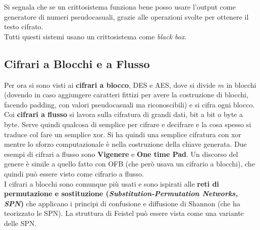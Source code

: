 \documentclass[a4paper,12pt, oneside]{book}
\begin{document}
Si segnala che se un crittosistema funziona bene posso usare l'output come
generatore di numeri pseudocasuali, grazie alle operazioni svolte per ottenere
il testo cifrato.\\
Tutti questi sistemi usano un crittosistema come \textit{black box}.\\
\subsection{Cifrari a Blocchi e a Flusso}
Per ora si sono visti ai \textbf{cifrari a blocco}, DES e AES, dove si divide
$m$ in blocchi (dovendo in caso aggiungere caratteri fittizi per avere la
costruzione di blocchi, facendo padding,
con valori pseudocasuali ma riconoscibili) e si cifra ogni blocco.\\
Coi \textbf{cifrari a flusso} si lavora sulla cifratura di grandi dati, bit a
bit o byte a byte. Serve quindi qualcosa di semplice per cifrare e decifrare e
la cosa spesso si traduce col fare un semplice xor. Si ha quindi una semplice
cifratura con xor mentre lo sforzo computazionale è nella costruzione della
chiave generata. Due esempi di cifrari a flusso sono \textbf{Vigenere} e
\textbf{One time Pad}. Un discorso del genere è simile a quello fatto con OFB
(che però usava un cifrario a blocchi), che quindi può essere visto come
cifrario a flusso.\\
I cifrari a blocchi sono comunque più usati e sono ispirati alle \textbf{reti di
permutazione e sostituzione (\textit{Substitution-Permutation Networks, SPN})}
che applicano i principi di confusione e diffusione di Shannon (che ha
teorizzato le SPN). La struttura di Feistel può essere vista come una
variante delle SPN.
\end{document}
